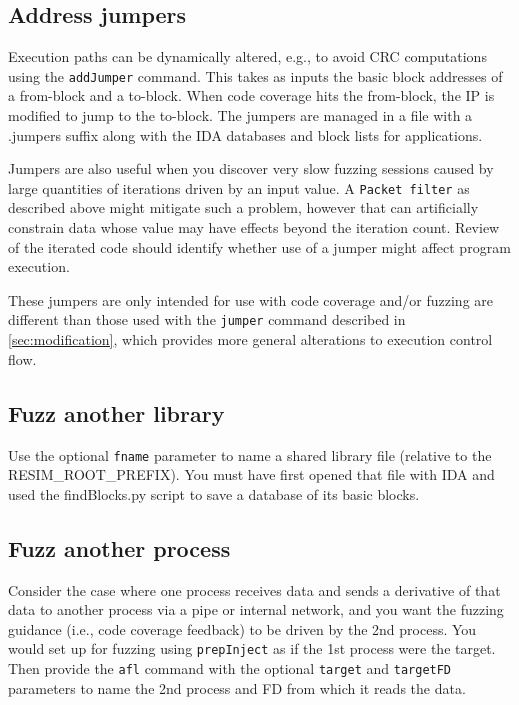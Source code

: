 \documentclass[titlepage]{article}
\begin{document}
\subsection{Address jumpers}
\label{jumpers}
Execution paths can be dynamically altered, e.g., to avoid CRC computations using the {\tt addJumper} command.  This takes as inputs
the basic block addresses of a from-block and a to-block. When code coverage hits the from-block, the IP is modified to jump to the
to-block.  The jumpers are managed in a file with a .jumpers suffix along with the IDA databases and block lists for applications.

Jumpers are also useful when you discover very slow fuzzing sessions caused by large quantities of iterations driven by an input value.
A {\tt Packet filter} as described above might mitigate such a problem, however that can artificially constrain data whose value may
have effects beyond the iteration count.  Review of the iterated code should identify whether use of a jumper might affect program
execution.

These jumpers are only intended for use with code coverage and/or fuzzing are different than those used with the {\tt jumper} command described
in \ref{sec:modification},
which provides more general alterations to execution control flow.

\subsection{Fuzz another library}
Use the optional {\tt fname} parameter to name a shared library file (relative to the RESIM\_ROOT\_PREFIX).  You must have first
opened that file with IDA and used the findBlocks.py script to save a database of its basic blocks.

\subsection{Fuzz another process}
Consider the case where one process receives data and sends a derivative of that data to another process via a pipe or internal network,
and you want the fuzzing guidance (i.e., code coverage feedback) to be driven by the 2nd process.  You would set up for fuzzing using
{\tt prepInject} as if the 1st process were the target.  Then provide the {\tt afl} command with the optional {\tt target} and {\tt targetFD}
parameters to name the 2nd process and FD from which it reads the data.
\end{document}
